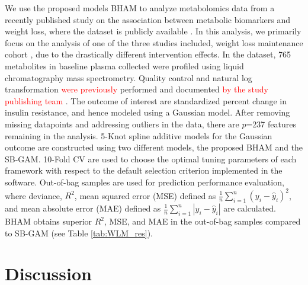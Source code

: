 \documentclass[AMA,STIX1COL,]{WileyNJD-v2}
\begin{document}
We use the proposed models BHAM to analyze metabolomics data from a
recently published study \citep{Bihlmeyer2021} on the association
between metabolic biomarkers and weight loss, where the dataset is
publicly available \citep{Bihlmeyer2021_data}. In this analysis, we
primarily focus on the analysis of one of the three studies included,
weight loss maintenance cohort \citep{Svetkey2008}, due to the
drastically different intervention effects. In the dataset, 765
metabolites in baseline plasma collected were profiled using liquid
chromatography mass spectrometry. Quality control and natural log
transformation \textcolor{red}{were previously} performed and documented
\textcolor{red}{by the study publishing team \cite{Bihlmeyer2021}}. The
outcome of interest are standardized percent change in insulin
resistance, and hence modeled using a Gaussian model. After removing
missing datapoints and addressing outliers in the data, there are
\(p\)=237 features remaining in the analysis. 5-Knot spline additive
models for the Gaussian outcome are constructed using two different
models, the proposed BHAM and the SB-GAM. 10-Fold CV are used to choose
the optimal tuning parameters of each framework with respect to the
default selection criterion implemented in the software. Out-of-bag
samples are used for prediction performance evaluation, where deviance,
\(R^2\), mean squared error (MSE) defined as
\(\frac{1}{n}\sum\limits^{n}_{i=1}(y_i - \hat y_i)^2\), and mean
absolute error (MAE) defined as
\(\frac{1}{n}\sum\limits^{n}_{i=1}|y_i - \hat y_i|\) are calculated.
BHAM obtains superior \(R^2\), MSE, and MAE in the out-of-bag samples
compared to SB-GAM (see Table \ref{tab:WLM_res}).

\section{Discussion}
\label{sec:concl}
\end{document}
